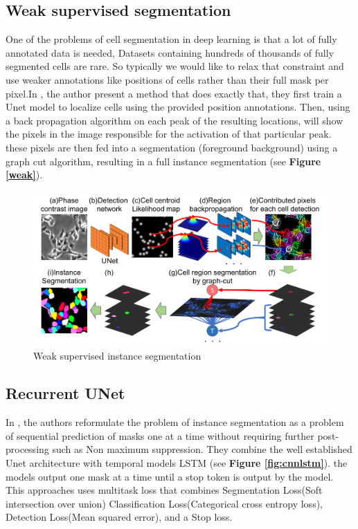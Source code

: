 \documentclass[main.tex]{subfiles}
\begin{document}
\subsection{Weak supervised segmentation} One of the problems of cell segmentation in deep learning is that a lot of fully annotated data is needed, Datasets containing hundreds of thousands of fully segmented cells are rare. So typically we would like to relax that constraint and use weaker annotations like positions of cells rather than their full mask per pixel.In \cite{Nishimura2019}, the author present a method that does exactly that, they first train a Unet model to localize cells using the provided position annotations. Then, using a back propagation algorithm on each peak of the resulting locations, will show the pixels in the image responsible for the activation of that particular peak. these pixels are then fed into a segmentation (foreground background) using a graph cut algorithm, resulting in a full instance segmentation (see \textbf{Figure \ref{weak}}).
\begin{figure}
    \centering
    \includegraphics[width=16cm]{images/weak.png}
    \caption{Weak supervised instance segmentation}
    \label{fig:weak}
\end{figure}


\subsection{Recurrent UNet}
In \cite{Salvador2017}, the authors reformulate the problem of instance segmentation as a problem of sequential prediction of masks one at a time without requiring further post-processing such as Non maximum suppression. They combine the well established Unet architecture with temporal models LSTM (see \textbf{Figure \ref{fig:cnnlstm}}). the models output one mask at a time until a stop token is output by the model. This approaches uses multitask loss that combines Segmentation Loss(Soft intersection over union)
Classification Loss(Categorical cross entropy loss), Detection Loss(Mean squared error), and a Stop loss.
\end{document}
